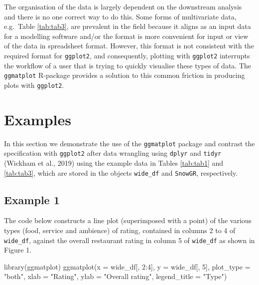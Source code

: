 \documentclass[10pt,a4paper,onecolumn]{article}
\newenvironment{Shaded}{\begin{snugshade}}{\end{snugshade}}
\newcommand{\AttributeTok}[1]{\textcolor[rgb]{0.77,0.63,0.00}{#1}}
\newcommand{\DecValTok}[1]{\textcolor[rgb]{0.00,0.00,0.81}{#1}}
\newcommand{\FunctionTok}[1]{\textcolor[rgb]{0.00,0.00,0.00}{#1}}
\newcommand{\NormalTok}[1]{#1}
\newcommand{\SpecialCharTok}[1]{\textcolor[rgb]{0.00,0.00,0.00}{#1}}
\newcommand{\StringTok}[1]{\textcolor[rgb]{0.31,0.60,0.02}{#1}}
\begin{document}
The organisation of the data is largely dependent on the downstream
analysis and there is no one correct way to do this. Some forms of
multivariate data, e.g.~Table \ref{tab:tab3}, are prevalent in the field
because it aligns as an input data for a modelling software and/or the
format is more convenient for input or view of the data in spreadsheet
format. However, this format is not consistent with the required format
for \texttt{ggplot2}, and consequently, plotting with \texttt{ggplot2}
interrupts the workflow of a user that is trying to quickly visualise
these types of data. The \texttt{ggmatplot} R-package provides a
solution to this common friction in producing plots with
\texttt{ggplot2}.

\hypertarget{examples}{%
\section{Examples}\label{examples}}

In this section we demonstrate the use of the \texttt{ggmatplot} package
and contrast the specification with \texttt{ggplot2} after data
wrangling using \texttt{dplyr} and \texttt{tidyr} (Wickham et al., 2019)
using the example data in Tables \ref{tab:tab1} and \ref{tab:tab3},
which are stored in the objects \texttt{wide\_df} and \texttt{SnowGR},
respectively.

\hypertarget{example-1}{%
\subsection{Example 1}\label{example-1}}

The code below constructs a line plot (superimposed with a point) of the
various types (food, service and ambience) of rating, contained in
columns 2 to 4 of \texttt{wide\_df}, against the overall restaurant
rating in column 5 of \texttt{wide\_df} as shown in Figure 1.

\begin{Shaded}
\begin{Highlighting}[]
\FunctionTok{library}\NormalTok{(ggmatplot)}
\FunctionTok{ggmatplot}\NormalTok{(}\AttributeTok{x =}\NormalTok{ wide\_df[, }\DecValTok{2}\SpecialCharTok{:}\DecValTok{4}\NormalTok{], }\AttributeTok{y =}\NormalTok{ wide\_df[, }\DecValTok{5}\NormalTok{], }\AttributeTok{plot\_type =} \StringTok{"both"}\NormalTok{,}
          \AttributeTok{xlab =} \StringTok{"Rating"}\NormalTok{,  }\AttributeTok{ylab =} \StringTok{"Overall rating"}\NormalTok{, }\AttributeTok{legend\_title =} \StringTok{"Type"}\NormalTok{) }
\end{Highlighting}
\end{Shaded}
\end{document}
